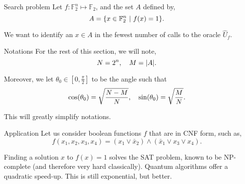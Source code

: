 \documentclass[a4paper]{article}
\begin{document}
\begin{parag}{Search problem}
    Let $f: \mathbb{F}_2^n \mapsto \mathbb{F}_2$, and the set $A$ defined by,
    \[A = \left\{x \in \mathbb{F}_2^n \suchthat f\left(x\right) = 1\right\}.\]

    We want to identify an $x \in A$ in the fewest number of calls to the oracle $\hat{U}_f$.

    \begin{subparag}{Notations}
        For the rest of this section, we will note,
        \[N = 2^n, \mathspace M = \left|A\right|.\]

        Moreover, we let $\theta_0 \in \left[0, \frac{\pi}{2}\right]$ to be the angle such that 
        \[\cos\left(\theta_0\right) = \sqrt{\frac{N - M}{N}}, \mathspace \sin\left(\theta_0\right) = \sqrt{\frac{M}{N}}.\]

        This will greatly simplify notations.
    \end{subparag}

    \begin{subparag}{Application}
        Let us consider boolean functions $f$ that are in CNF form, such as,
        \[f\left(x_1, x_2, x_3, x_4\right) = \left(x_1 \lor \bar{x}_2\right) \land \left(\bar{x}_1 \lor x_3 \lor x_4\right).\]
        
        Finding a solution $x$ to $f\left(x\right) = 1$ solves the SAT problem, known to be NP-complete (and therefore very hard classically). Quantum algorithms offer a quadratic speed-up. This is still exponential, but better.
    \end{subparag}
\end{parag}
\end{document}

